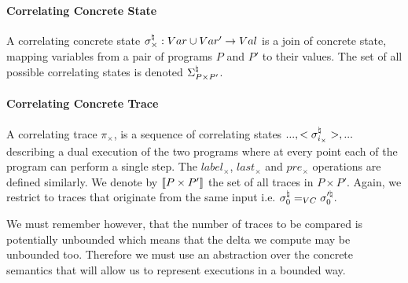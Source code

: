 \paragraph{Correlating Concrete State} 
A correlating concrete state $\sigma^\natural_{\times} : Var \cup Var' \rightarrow Val$ is a join of concrete state, mapping variables from a pair of programs $P$ and $P'$ to their values. The set of all possible correlating states is denoted $\Sigma^\natural_{P \times P'}$.

\paragraph{Correlating Concrete Trace} 
A correlating trace $\pi_{\times}$, is a sequence of correlating states $...,<\sigma^\natural_{i_{\times}}>,...$ describing a dual execution of the two programs where at every point each of the program can perform a single step. The $label_{\times}$, $last_{\times}$ and $pre_{\times}$ operations are defined similarly. We denote by $\lbrack\!\lbrack P \times P' \rbrack\!\rbrack$ the set of all traces in $P \times P'$. Again, we restrict to traces that originate from the same input i.e. $\sigma^\natural_0 =_{VC} \sigma'^\natural_0$.

We must remember however, that the number of traces to be compared is potentially unbounded which means that the delta we compute may be unbounded too. Therefore we must use an abstraction over the concrete semantics that will allow us to represent executions in a bounded way.
